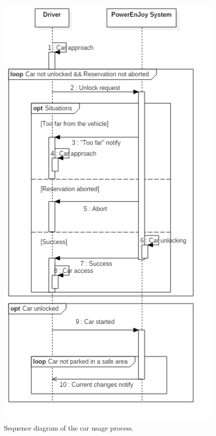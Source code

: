\begin{figure}[H]
	\begin{center}
		\centering
		\includegraphics[height=0.9\textheight, keepaspectratio]{sequence_diagram/Unlock.png}
		\caption{Sequence diagram of the car usage process.}
	\end{center}
\end{figure}


